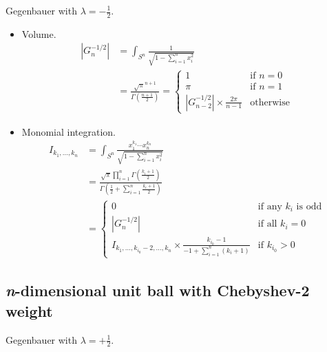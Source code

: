\documentclass[draft]{scrartcl}
\begin{document}
Gegenbauer with $\lambda=-\frac{1}{2}.$

\begin{itemize}
  \item Volume.
  \[
    \begin{split}
    |G_n^{-1/2}|
      &= \int_{S^n} \frac{1}{\sqrt{1 - \sum_{i=1}^n x_i^2}}\\
      &= \frac{
        \sqrt{\pi}^{n+1}
      }{
        \Gamma\left(\frac{n+1}{2}\right)
      }
      =\begin{cases}
        1&\text{if $n=0$}\\
        \pi&\text{if $n=1$}\\
        |G_{n-2}^{-1/2}| \times \frac{2\pi}{n-1}&\text{otherwise}
      \end{cases}
    \end{split}
  \]

  \item Monomial integration.
  \[
    \begin{split}
    I_{k_1,\dots,k_n}
      &= \int_{S^n} \frac{x_1^{k_1}\cdots x_n^{k_n}}{\sqrt{1 - \sum_{i=1}^n x_i^2}}\\
      &= \frac{
        \sqrt{\pi} \prod_{i=1}^n \Gamma\left(\frac{k_i+1}{2}\right)
      }{
        \Gamma\left(\frac{1}{2} + \sum_{i=1}^n \frac{k_i+1}{2}\right)
      }\\
      &= \begin{cases}
        0&\text{if any $k_i$ is odd}\\
        |G_n^{-1/2}|&\text{if all $k_i=0$}\\
        I_{k_1,\dots,k_{i_0}-2,\dots,k_n} \times \frac{k_{i_0}-1}{-1 + \sum_{i=1}^n(k_i+1)}&\text{if $k_{i_0} > 0$}
      \end{cases}
    \end{split}
  \]
\end{itemize}


\subsection*{\textit{n}-dimensional unit ball with Chebyshev-2 weight}
Gegenbauer with $\lambda = +\frac{1}{2}.$
\end{document}
